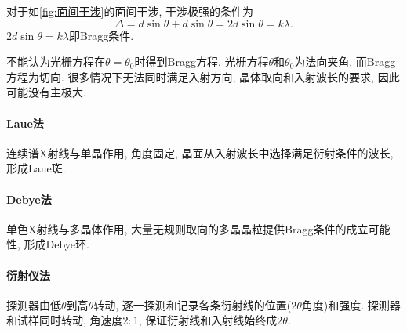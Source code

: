 \documentclass{ctexart}
\begin{document}
对于如\cref{fig:面间干涉}的面间干涉, 干涉极强的条件为
\[ \Delta = d\sin\theta + d\sin\theta = 2d\sin\theta = k\lambda. \]
$2d\sin\theta = k\lambda$即Bragg条件.
\begin{remark}
    不能认为光栅方程在$\theta = \theta_0$时得到Bragg方程. 光栅方程$\theta$和$\theta_0$为法向夹角, 而Bragg方程为切向.  很多情况下无法同时满足入射方向, 晶体取向和入射波长的要求, 因此可能没有主极大.
\end{remark}


\paragraph{Laue法} %
\label{par:laue法}

连续谱X射线与单晶作用, 角度固定, 晶面从入射波长中选择满足衍射条件的波长, 形成Laue斑.


\paragraph{Debye法} %
\label{par:debye法}

单色X射线与多晶体作用, 大量无规则取向的多晶晶粒提供Bragg条件的成立可能性, 形成Debye环.


\paragraph{衍射仪法} %
\label{par:衍射仪法}

探测器由低$\theta$到高$\theta$转动, 逐一探测和记录各条衍射线的位置($2\theta$角度)和强度. 探测器和试样同时转动, 角速度$2:1$, 保证衍射线和入射线始终成$2\theta$.



\end{document}

